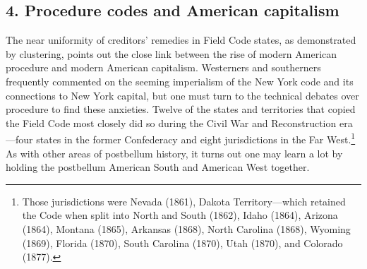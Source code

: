 \documentclass[12pt,]{article}
\let\rmarkdownfootnote\footnote%
\def\footnote{\protect\rmarkdownfootnote}
\begin{document}
\hypertarget{procedure-codes-and-american-capitalism}{%
\subsection{4. Procedure codes and American
capitalism}\label{procedure-codes-and-american-capitalism}}

The near uniformity of creditors' remedies in Field Code states, as
demonstrated by clustering, points out the close link between the rise
of modern American procedure and modern American capitalism. Westerners
and southerners frequently commented on the seeming imperialism of the
New York code and its connections to New York capital, but one must turn
to the technical debates over procedure to find these anxieties. Twelve
of the states and territories that copied the Field Code most closely
did so during the Civil War and Reconstruction era---four states in the
former Confederacy and eight jurisdictions in the Far West.\footnote{Those
  jurisdictions were Nevada (1861), Dakota Territory---which retained
  the Code when split into North and South (1862), Idaho (1864), Arizona
  (1864), Montana (1865), Arkansas (1868), North Carolina (1868),
  Wyoming (1869), Florida (1870), South Carolina (1870), Utah (1870),
  and Colorado (1877).} As with other areas of postbellum history, it
turns out one may learn a lot by holding the postbellum American South
and American West together.
\end{document}
